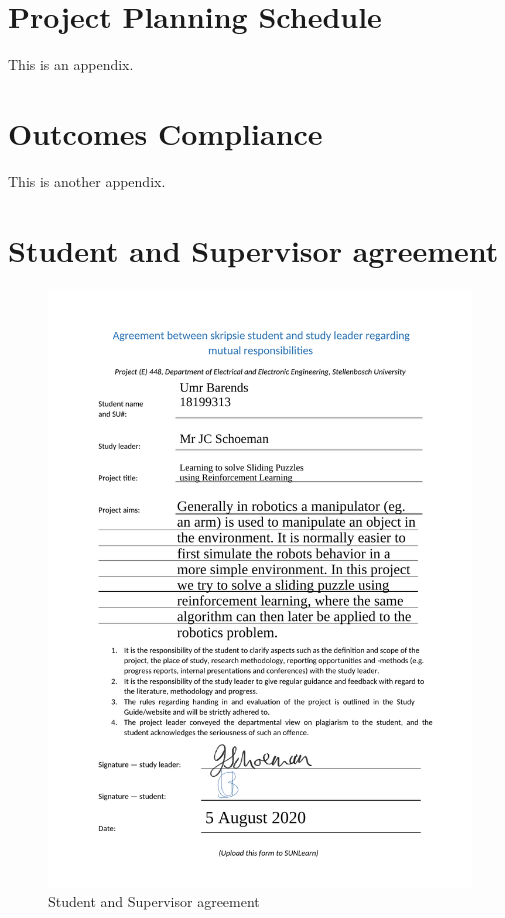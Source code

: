 \chapter{Project Planning Schedule}
\makeatletter{}\makeatother
\label{appen:derivations_bigramseg}

This is an appendix.

\chapter{Outcomes Compliance}
\makeatletter{}\makeatother
\label{appen:derivations_bigramseg2}

This is another appendix.

\chapter{Student and Supervisor agreement}
\makeatletter{}\makeatother
\label{appen:Student_and_Supervisor_agreement}
\begin{figure}[!htb]
	\centering
	\includegraphics[width=0.75\linewidth]{appendices/fig/Umr_Barends_18199313_Student_and_Supervisor_agreement.pdf}
	\caption{Student and Supervisor agreement}
	\label{fig:agreement}
\end{figure}
